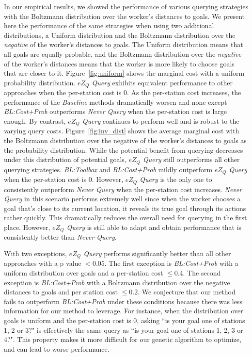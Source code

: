\documentclass[letterpaper]{article}
\begin{document}
In our empirical results, we showed the performance of various querying strategies with the Boltzmann distribution over the worker's distances to goals. We present here the performance of the same strategies when using two additional distributions, a Uniform distribution and the Boltzmann distribution over the \emph{negative} of the worker's distances to goals. The Uniform distribution means that all goals are equally probable, and the Boltzmann distribution over the \emph{negative} of the worker's distances means that the worker is more likely to choose goals that are closer to it.
Figure~\ref{fig:uniform} shows the marginal cost with a uniform probability distribution. \emph{$eZ_Q$ Query} exhibits equivalent performance to other approaches when the per-station cost is $0$. As the per-station cost increases, the performance of the \emph{Baseline} methods dramatically worsen and none except \emph{BL:Cost+Prob} outperforms \emph{Never Query} when the per-station cost is large enough. By contrast, \emph{$eZ_Q$ Query} continues to perform well and is robust to the varying query costs.
Figure~\ref{fig:inv_dist} shows the average marginal cost with the Boltzmann distribution over the negative of the worker's distances to goals as the probability distribution. While the potential benefit from querying decreases under this distribution of potential goals, \emph{$eZ_Q$ Query} still outperforms all other querying strategies. \emph{BL:Toolbox} and \emph{BL:Cost+Prob} mildly outperform \emph{$eZ_Q$ Query} when the per-station cost is 0. However, \emph{$eZ_Q$ Query} is the only one to consistently outperform \emph{Never Query} when the per-station cost increases. \emph{Never Query} in this scenario performs extremely well since when the worker chooses a goal that's close to its current location, it reveals its true goal through its actions rather quickly. This dramatically reduces the overall need for querying in the first place. However, \emph{$eZ_Q$ Query} is still able to adapt and obtain performance that is consistently better than \emph{Never Query}.

With two exceptions, \emph{$eZ_Q$ Query} performs significantly better than all other approaches with a p value $<0.05$. The first exception is \emph{BL:Cost+Prob} with a uniform distribution over goals and a per-station cost $\leq 0.4$. The second exception is \emph{BL:Cost+Prob} with a Boltzmann distribution over the negative distances to goals and per station cost $\leq 0.2$.  We conjecture that our method fails to outperform \emph{BL:Cost+Prob} under these conditions because there was less information for our method to leverage. 
 For instance, when the distribution over goals is uniform and the per-station cost is 0, asking ``is your goal one of stations 1, 2 or 3?" is effectively the same query as ``is your goal one of stations 1, 2, 3 or 4?". This property makes it more difficult for our genetic algorithm to optimize, and can lead to worse performance.
\end{document}
